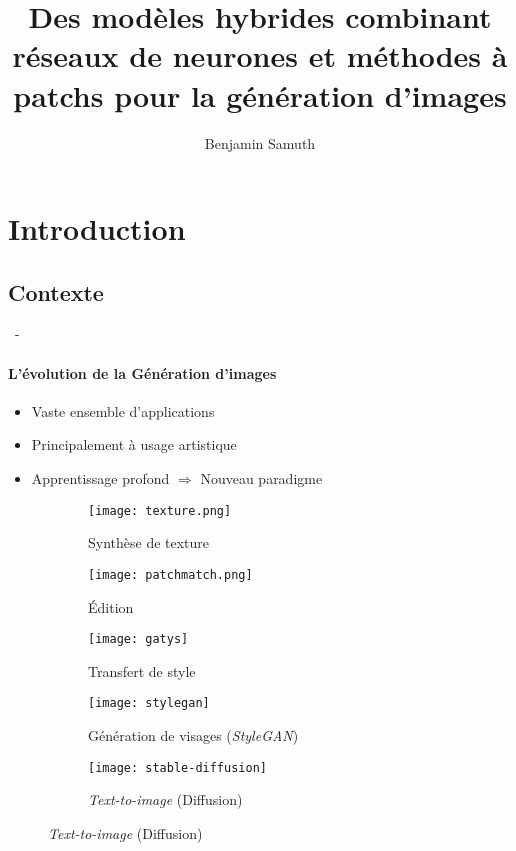 \documentclass[aspectratio=169, 22pt]{beamer}
\title[Modèles hybrides pour la génération d'images]{Des modèles hybrides combinant réseaux de neurones et méthodes à patchs pour la génération d'images}
\subtitle{}
\author[Benjamin Samuth]{Benjamin Samuth}
\institute[Normandie University]{Normandie Univ, UNICAEN, ENSICAEN, CNRS, GREYC, Caen, FRANCE}
\begin{document}
\begin{frame}
  \titlepage
\end{frame}

\section{Introduction}

\subsection{Contexte}
\begin{frame}{\secname~- \subsecname}
  \framesubtitle{L'évolution de la Génération d'images}
      \begin{itemize}
      \item Vaste ensemble d'applications
      \item Principalement à usage artistique
      \item Apprentissage profond $\Rightarrow$ \alert{Nouveau paradigme}
      \end{itemize}
      
      \begin{figure}
        \captionsetup[subfigure]{labelformat=empty}
        \centering
        \begin{subfigure}[t]{0.19\linewidth}\centering
          \texttt{[image: texture.png]}
          \caption{{\scriptsize Synthèse de texture \newline {\tiny [Ashikhmin et al., 2001]}}}
        \end{subfigure}
        \begin{subfigure}[t]{0.19\linewidth}\centering
          \texttt{[image: patchmatch.png]}
          \caption{{\footnotesize Édition \newline {\scriptsize [Barnes et al., 2009]}}}
        \end{subfigure}        
        \begin{subfigure}[t]{0.19\linewidth}\centering
          \texttt{[image: gatys]}
          \caption{{\footnotesize Transfert de style \newline {\scriptsize [Gatys et al., 2016]}}}
        \end{subfigure}
        \begin{subfigure}[t]{0.19\linewidth}\centering
          \texttt{[image: stylegan]}
          \caption{{\footnotesize Génération de visages (\emph{StyleGAN}) \newline {\scriptsize [Karras et al., 2019]}}}
        \end{subfigure}        
        \begin{subfigure}[t]{0.19\linewidth}\centering
          \texttt{[image: stable-diffusion]}
          \caption{{\footnotesize \emph{Text-to-image} (Diffusion) \newline {\tiny [Rombach et al., 2022]}}}
        \end{subfigure}
      \end{figure}
\end{frame}
\end{document}
